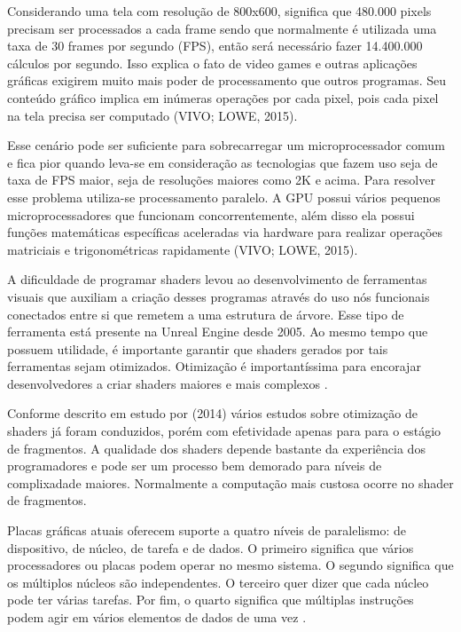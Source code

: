 Considerando uma tela com resolução de 800x600, significa que 480.000 pixels precisam ser processados a cada frame sendo que normalmente é utilizada uma taxa de 30 frames por segundo (\acrshort{FPS}), então será necessário fazer 14.400.000 cálculos por segundo. Isso explica o fato de video games e outras aplicações gráficas exigirem muito mais poder de processamento que outros programas. Seu conteúdo gráfico implica em inúmeras operações por cada pixel, pois cada pixel na tela precisa ser computado (VIVO; LOWE, 2015)\nocite{bookOfShaders}.  

Esse cenário pode ser suficiente para sobrecarregar um microprocessador comum e fica pior quando leva-se em consideração as tecnologias que fazem uso seja de taxa de FPS maior, seja de resoluções maiores como 2K e acima. Para resolver esse problema utiliza-se processamento paralelo. A GPU possui vários pequenos microprocessadores que funcionam concorrentemente, além disso ela possui funções matemáticas específicas aceleradas via hardware para realizar operações matriciais e trigonométricas rapidamente (VIVO; LOWE, 2015)\nocite{bookOfShaders}.

A dificuldade de programar shaders levou ao desenvolvimento de ferramentas visuais que auxiliam a criação desses programas através do uso nós funcionais conectados entre si que remetem a uma estrutura de árvore. Esse tipo de ferramenta está presente na Unreal Engine desde 2005. Ao mesmo tempo que possuem utilidade, é importante garantir que shaders gerados por tais ferramentas sejam otimizados. Otimização é importantíssima para encorajar desenvolvedores a criar shaders maiores e mais complexos \cite{jensen2007shader}.

Conforme descrito em estudo por  (2014) vários estudos sobre otimização de shaders já foram conduzidos, porém com efetividade apenas para para o estágio de fragmentos. A qualidade dos shaders depende bastante da experiência dos programadores e pode ser um processo bem demorado para níveis de complixadade maiores. Normalmente a computação mais custosa ocorre no shader de fragmentos. 

Placas gráficas atuais oferecem suporte a quatro níveis de paralelismo: de dispositivo, de núcleo, de tarefa e de dados. O primeiro significa que vários processadores ou placas podem operar no mesmo sistema. O segundo significa que os múltiplos núcleos são independentes. O terceiro quer dizer que cada núcleo pode ter várias tarefas. Por fim, o quarto significa que múltiplas instruções podem agir em vários elementos de dados de uma vez \cite{hasu2018modern}.

